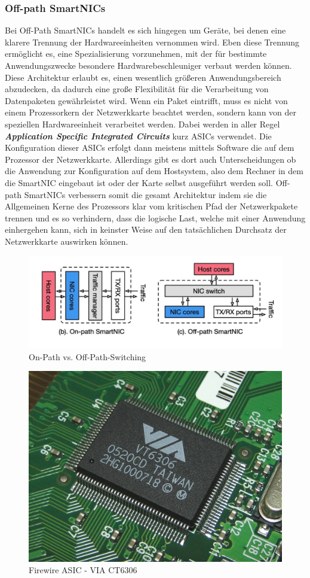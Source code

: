 \subsubsection{Off-path SmartNICs}
Bei Off-Path SmartNICs handelt es sich hingegen um Geräte, bei denen eine klarere Trennung der Hardwareeinheiten vernommen wird. Eben diese Trennung ermöglicht es, eine Spezialisierung vorzunehmen, mit der für bestimmte Anwendungszwecke besondere Hardwarebeschleuniger verbaut werden können.  Diese Architektur erlaubt es, einen wesentlich größeren Anwendungsbereich abzudecken, da dadurch eine große Flexibilität für die Verarbeitung von Datenpaketen gewährleistet wird. Wenn ein Paket eintrifft, muss es nicht von einem Prozessorkern der Netzwerkkarte beachtet werden, sondern kann von der speziellen Hardwareeinheit verarbeitet werden. \cite{onoffpath} Dabei werden in aller Regel \textbf{\textit{Application Specific Integrated Circuits}} kurz ASICs verwendet. Die Konfiguration dieser ASICs erfolgt dann meistens mittels Software die auf dem Prozessor der Netzwerkkarte. Allerdings gibt es dort auch Unterscheidungen ob die Anwendung zur Konfiguration auf dem Hostsystem, also dem Rechner in dem die SmartNIC eingebaut ist oder der Karte selbst ausgeführt werden soll. Off-path SmartNICs verbessern somit die gesamt Architektur indem sie die Allgemeinen Kerne des Prozessors klar vom kritischen Pfad der Netzwerkpakete trennen und es so verhindern, dass die logische Last, welche mit einer Anwendung einhergehen kann, sich in keinster Weise auf den tatsächlichen Durchsatz der Netzwerkkarte auswirken können.
\begin{figure}
    \centering
    \includegraphics[width=0.9\linewidth]{images/Screenshot 2025-03-16 at 10-41-14 Netdev 0x14 -- Taking Control of your SmartNIC v1.pdf.png}
    \caption{On-Path vs. Off-Path-Switching \cite{onoffpathpic}}
    \label{fig:enter-label}
\end{figure}
\begin{figure}
    \centering
    \includegraphics[width=0.5\linewidth]{images/Buffalo_IFC-ILP4_VIA_VT6306.jpg}
    \caption{Firewire ASIC - VIA CT6306 \cite{firewireasic}}
    \label{fig:enter-label}
\end{figure}
